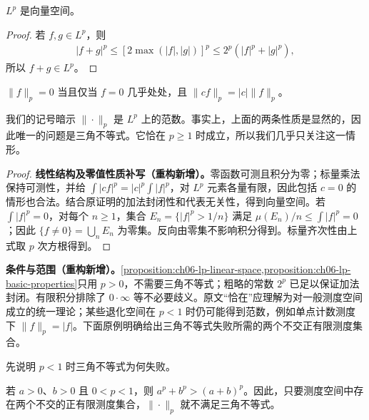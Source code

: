 \documentclass[../../main.tex]{subfiles}
\begin{document}
\begin{proposition}\label{proposition:ch06-lp-linear-space}
$L^p$ 是向量空间。
\end{proposition}
\begin{proof}
若 $f,g\in L^p$，则
\begin{align*}
|f+g|^p\leqslant[2\max(|f|,|g|)]^p\leqslant2^p(|f|^p+|g|^p),
\end{align*}
所以 $f+g\in L^p$。
\end{proof}
\begin{proposition}\label{proposition:ch06-lp-basic-properties}
$\|f\|_p=0$ 当且仅当 $f=0$ 几乎处处，且 $\|cf\|_p=|c|\|f\|_p$。
\end{proposition}
我们的记号暗示 $\|\cdot\|_p$ 是 $L^p$ 上的范数。事实上，上面的两条性质是显然的，因此唯一的问题是三角不等式。它恰在 $p\geqslant1$ 时成立，所以我们几乎只关注这一情形。
\begin{proof}
\textbf{线性结构及零值性质补写（重构新增）。}零函数可测且积分为零；标量乘法保持可测性，并给 $\int|cf|^p=|c|^p\int|f|^p$，对 $L^p$ 元素各量有限，因此包括 $c=0$ 的情形也合法。结合原证明的加法封闭性和代表无关性，得到向量空间。若 $\int|f|^p=0$，对每个 $n\geqslant1$，集合 $E_n=\{|f|^p>1/n\}$ 满足 $\mu(E_n)/n\leqslant\int|f|^p=0$；因此 $\{f\ne0\}=\bigcup_nE_n$ 为零集。反向由零集不影响积分得到。标量齐次性由上式取 $p$ 次方根得到。
\end{proof}
\begin{remark}
\textbf{条件与范围（重构新增）。}\cref{proposition:ch06-lp-linear-space,proposition:ch06-lp-basic-properties}只用 $p>0$，不需要三角不等式；粗略的常数 $2^p$ 已足以保证加法封闭。有限积分排除了 $0\cdot\infty$ 等不必要歧义。原文“恰在”应理解为对一般测度空间成立的统一理论；某些退化空间在 $p<1$ 时仍可能得到范数，例如单点计数测度下 $\|f\|_p=|f|$。下面原例明确给出三角不等式失败所需的两个不交正有限测度集合。
\end{remark}
先说明 $p<1$ 时三角不等式为何失败。
\begin{example}\label{example:ch06-small-p-triangle}
若 $a>0$、$b>0$ 且 $0<p<1$，则 $a^p+b^p>(a+b)^p$。因此，只要测度空间中存在两个不交的正有限测度集合，$\|\cdot\|_p$ 就不满足三角不等式。
\end{example}
\end{document}
